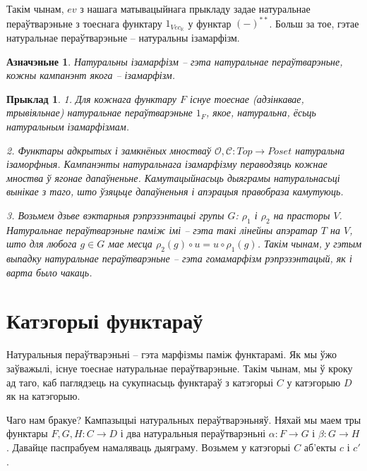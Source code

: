 \documentclass[a4paper,12pt]{book}
\newtheorem{example}{Прыклад}[section]
\newtheorem{definition}{Азначэньне}[section]
\begin{document}
Такім чынам, $ev$ з нашага матывацыйнага прыкладу задае натуральнае
пераўтварэньне з тоеснага функтару $1_{Vec_{\mathbb{K}}}$ у функтар
$(-)^{**}$. Больш за тое, гэтае натуральнае пераўтварэньне --
натуральны ізамарфізм.

\begin{definition}
  Натуральны ізамарфізм -- гэта натуральнае пераўтварэньне, кожны
  кампанэнт якога -- ізамарфізм.
\end{definition}

\begin{example}
  1. Для кожнага функтару $F$ існуе тоеснае (адзінкавае, трывіяльнае)
  натуральнае пераўтварэньне
  $1_F$, якое, натуральна, ёсьць натуральным ізамарфізмам.

  2. Функтары адкрытых і замкнёных мностваў $\mathcal{O}, \mathcal{C}:
  Top \rightarrow Poset$ натуральна ізаморфныя. Кампанэнты
  натуральнага ізамарфізму пераводзяць кожнае мноства ў ягонае
  дапаўненьне. Камутацыйнасьць дыяграмы натуральнасьці вынікае з таго,
  што ўзяцьце дапаўненьня і апэрацыя правобраза камутуюць.

  3. Возьмем дзьве вэктарныя рэпрэзэнтацыі групы $G$: $\rho_1$ і
  $\rho_2$ на прасторы $V$. Натуральнае пераўтварэньне паміж імі --
  гэта такі лінейны апэратар $T$ на $V$, што для любога $g \in G$
  мае месца $\rho_2(g) \circ u = u \circ \rho_1(g)$. Такім чынам, у
  гэтым выпадку натуральнае пераўтварэньне -- гэта гомамарфізм
  рэпрэзэнтацый, як і варта было чакаць.
\end{example}

\section{Катэгорыі функтараў}

Натуральныя пераўтварэньні -- гэта марфізмы паміж функтарамі. Як мы
ўжо заўважылі, існуе тоеснае натуральнае пераўтварэньне. Такім чынам,
мы ў кроку ад таго, каб паглядзець на сукупнасьць функтараў з
катэгорыі $C$ у катэгорыю $D$ як на катэгорыю.

Чаго нам бракуе? Кампазыцыі натуральных пераўтварэньняў. Няхай мы маем
тры функтары $F, G, H: C
\rightarrow D$ і два натуральныя пераўтварэньні $\alpha: F \rightarrow
G$ і $\beta: G \rightarrow H$. Давайце
паспрабуем намаляваць дыяграму. Возьмем у катэгорыі $C$ аб'екты $c$ і $c'$.

\end{document}
